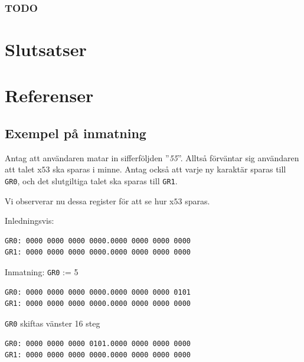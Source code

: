 \documentclass[]{article}
\begin{document}
\subsubsection{TODO}

\section{Slutsatser}
\section{Referenser}

\clearpage

\begin{appendices}
\section{Exempel på inmatning}\label{app:input_example}
Antag att användaren matar in sifferföljden ''\textit{55}''. Alltså förväntar sig användaren att talet x$53$ ska sparas i minne. Antag också att varje ny karaktär sparas till \texttt{GR0}, och det slutgiltiga talet ska sparas till \texttt{GR1}.

Vi observerar nu dessa register för att se hur x$53$ sparas.
\newline
\newline

\noindent
Inledningsvis:
\begin{framed}
\begin{verbatim}
GR0: 0000 0000 0000 0000.0000 0000 0000 0000
GR1: 0000 0000 0000 0000.0000 0000 0000 0000
\end{verbatim}
\end{framed}

\noindent
Inmatning: \texttt{GR0} := 5
\begin{framed}
\begin{verbatim}
GR0: 0000 0000 0000 0000.0000 0000 0000 0101
GR1: 0000 0000 0000 0000.0000 0000 0000 0000
\end{verbatim}
\end{framed}

\noindent
\texttt{GR0} skiftas vänster 16 steg
\begin{framed}
\begin{verbatim}
GR0: 0000 0000 0000 0101.0000 0000 0000 0000
GR1: 0000 0000 0000 0000.0000 0000 0000 0000
\end{verbatim}
\end{framed}


\end{appendices}
\end{document}
